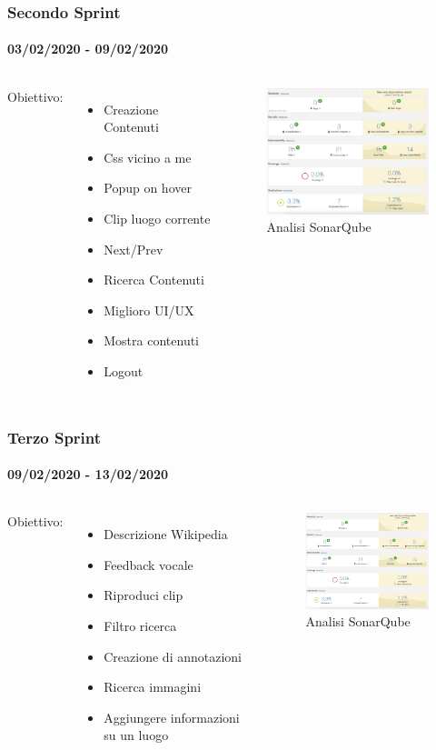 \documentclass{beamer}
\begin{document}
\begin{frame}
\frametitle{Secondo Sprint}
\framesubtitle{03/02/2020 - 09/02/2020}
\begin{columns}
Obiettivo:
  \begin{itemize}
	\item Creazione Contenuti
	\item Css vicino a me
	\item Popup on hover
	\item Clip luogo corrente
	\item Next/Prev
	\item Ricerca Contenuti
	\item Miglioro UI/UX
	\item Mostra contenuti
	\item Logout
  \end{itemize}
	\begin{figure}[h]
        \includegraphics[width=5cm]{Images/SonarQube/terzo-sprint.png}
        \caption{Analisi SonarQube}
   \end{figure}
\end{columns}
\end{frame}

\begin{frame}
\frametitle{Terzo Sprint}
\framesubtitle{09/02/2020 - 13/02/2020}
\begin{columns}
Obiettivo:
  \begin{itemize}
	\item Descrizione Wikipedia
	\item Feedback vocale
	\item Riproduci clip
	\item Filtro ricerca
	\item Creazione di annotazioni
	\item Ricerca immagini
	\item Aggiungere informazioni su un luogo
  \end{itemize}
	\begin{figure}[h]
        \includegraphics[width=5cm]{Images/SonarQube/terzo-sprint.png}
        \caption{Analisi SonarQube}
   \end{figure}
\end{columns}
\end{frame}
\end{document}
